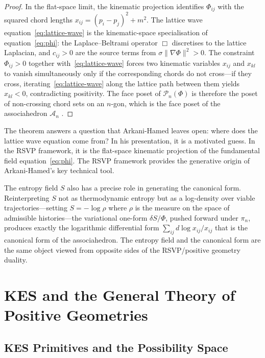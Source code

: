 \documentclass[12pt, oneside]{amsart}
\theoremstyle{plain}
\theoremstyle{definition}
\theoremstyle{remark}
\newcommand{\Phif}{\Phi}
\newcommand{\Sf}{S}
\newcommand{\Assoc}{\mathcal{A}_n}
\begin{document}
\begin{proof}
In the flat-space limit, the kinematic projection identifies $\Phif_{ij}$ with the squared chord lengths $x_{ij} = (p_i - p_j)^2 + m^2$. The lattice wave equation~\eqref{eq:lattice-wave} is the kinematic-space specialisation of equation~\eqref{eq:phi}: the Laplace--Beltrami operator $\Box$ discretises to the lattice Laplacian, and $c_{ij} > 0$ are the source terms from $\sigma\|\nabla\Phif\|^2 > 0$. The constraint $\Phif_{ij} > 0$ together with~\eqref{eq:lattice-wave} forces two kinematic variables $x_{ij}$ and $x_{kl}$ to vanish simultaneously only if the corresponding chords do not cross---if they cross, iterating~\eqref{eq:lattice-wave} along the lattice path between them yields $x_{kl} < 0$, contradicting positivity. The face poset of $\mathcal{P}_n(\Phif)$ is therefore the poset of non-crossing chord sets on an $n$-gon, which is the face poset of the associahedron $\Assoc$ \cite{Stasheff1963, Loday2004}.
\end{proof}

The theorem answers a question that Arkani-Hamed leaves open: where does the lattice wave equation come from? In his presentation, it is a motivated guess. In the RSVP framework, it is the flat-space kinematic projection of the fundamental field equation~\eqref{eq:phi}. The RSVP framework provides the generative origin of Arkani-Hamed's key technical tool.

The entropy field $\Sf$ also has a precise role in generating the canonical form. Reinterpreting $\Sf$ not as thermodynamic entropy but as a log-density over viable trajectories---setting $\Sf = -\log \rho$ where $\rho$ is the measure on the space of admissible histories---the variational one-form $\delta\Sf / \Phif$, pushed forward under $\pi_n$, produces exactly the logarithmic differential form $\sum_{ij} d\log x_{ij} / x_{ij}$ that is the canonical form of the associahedron. The entropy field and the canonical form are the same object viewed from opposite sides of the RSVP/positive geometry duality.

\section{KES and the General Theory of Positive Geometries}
\label{sec:kes}

\subsection{KES Primitives and the Possibility Space}
\end{document}
